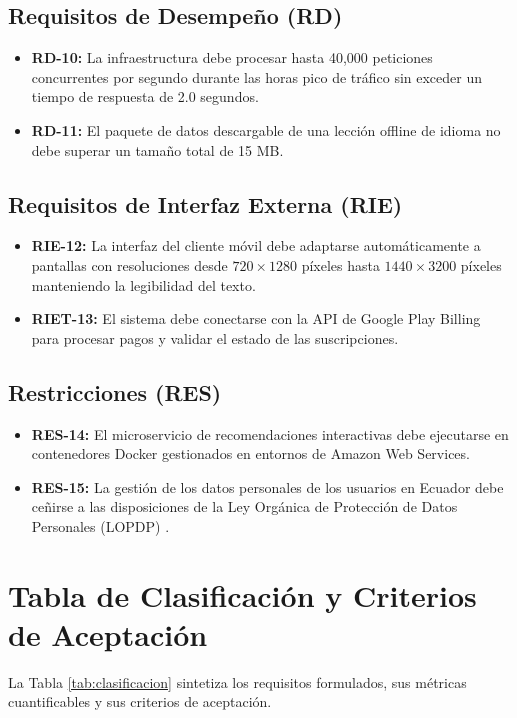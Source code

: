 \documentclass[11pt, a4paper]{article}
\begin{document}
\subsection{Requisitos de Desempeño (RD)}
\begin{itemize}
    \item \textbf{RD-10:} La infraestructura debe procesar hasta 40,000 peticiones concurrentes por segundo durante las horas pico de tráfico sin exceder un tiempo de respuesta de 2.0 segundos.
    \item \textbf{RD-11:} El paquete de datos descargable de una lección offline de idioma no debe superar un tamaño total de 15 MB.
\end{itemize}

\subsection{Requisitos de Interfaz Externa (RIE)}
\begin{itemize}
    \item \textbf{RIE-12:} La interfaz del cliente móvil debe adaptarse automáticamente a pantallas con resoluciones desde $720 \times 1280$ píxeles hasta $1440 \times 3200$ píxeles manteniendo la legibilidad del texto.
    \item \textbf{RIET-13:} El sistema debe conectarse con la API de Google Play Billing para procesar pagos y validar el estado de las suscripciones.
\end{itemize}

\subsection{Restricciones (RES)}
\begin{itemize}
    \item \textbf{RES-14:} El microservicio de recomendaciones interactivas debe ejecutarse en contenedores Docker gestionados en entornos de Amazon Web Services.
    \item \textbf{RES-15:} La gestión de los datos personales de los usuarios en Ecuador debe ceñirse a las disposiciones de la Ley Orgánica de Protección de Datos Personales (LOPDP) \cite{lopdp2021}.
\end{itemize}

\section{Tabla de Clasificación y Criterios de Aceptación}
La Tabla \ref{tab:clasificacion} sintetiza los requisitos formulados, sus métricas cuantificables y sus criterios de aceptación.
\end{document}
